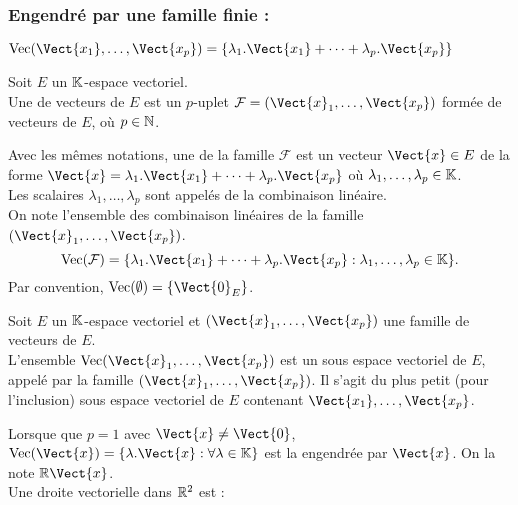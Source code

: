 \documentclass{book}
\begin{document}
\subsubsection{Engendré par une famille finie :  }
$\operatorname{Vec} (\Vect{x_1},\dots,\Vect{x_p})=\{\lambda_1. \Vect{x_1}+\dots + \lambda_p. \Vect{x_p} \}$
\begin{Definition}
Soit $E$ un $\mathbb{K} $-espace vectoriel.\\
Une  de vecteurs de $E$ est un $p$-uplet $\mathcal{F} = (\Vect{x}_1,\dots,\Vect{x_p})$ formée de vecteurs de $E$, où $p\in \mathbb{N}$.
\end{Definition}
\begin{Definition}
Avec les mêmes notations, une  de la famille $\mathcal{F}$ est un vecteur $\Vect{x} \in E$ de la forme $\Vect{x} = \lambda_1. \Vect{x_1}+\dots + \lambda_p. \Vect{x_p}$ où $\lambda_1,\dots,\lambda_p \in  \mathbb{K}$.\\
Les scalaires $\lambda_1,\dots,\lambda_p$ sont appelés  de la combinaison linéaire.\\
On note  l'ensemble des combinaison linéaires de la famille $(\Vect{x}_1,\dots,\Vect{x_p})$.\\
$$\operatorname{Vec}  (\mathcal{F})=\{ \lambda_1. \Vect{x_1}+\dots + \lambda_p. \Vect{x_p} : \lambda_1,\dots,\lambda_p \in  \K \}.$$
Par convention, $\operatorname{Vec} (\emptyset)= \{\Vect{0}_E\}$.
\end{Definition}
\begin{DefinitionProposition}
Soit $E$ un $\mathbb{K} $-espace vectoriel et $(\Vect{x}_1,\dots,\Vect{x_p})$ une famille de vecteurs de $E$.\\
L'ensemble $\operatorname{Vec} (\Vect{x}_1,\dots,\Vect{x_p})$ est un sous espace vectoriel  de $E$, appelé  par la famille $(\Vect{x}_1,\dots,\Vect{x_p})$.
Il s'agit du plus petit (pour l'inclusion) sous espace vectoriel  de $E$ contenant $\Vect{x_1},\dots,\Vect{x_p}$.
\end{DefinitionProposition}
\begin{Exemple}
Lorsque que $p=1$ avec $ \Vect{x} \neq \Vect{0}$, $\operatorname{Vec} (\Vect{x}) = \{\lambda .\Vect{x} : \forall \lambda  \in  \K  \}$
est la  engendrée par $\Vect{x}$. On la note $\R \Vect{x}$.\\
Une droite vectorielle dans $\mathbb{R} ^2$ est :
\begin{center}
\end{center}
\end{Exemple}
\end{document}

